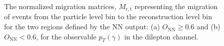 \begin{figure}[ht]
    \centering
    \quad\quad

    \caption{The normalized migration matrices, $M_{\mathrm{r,t}}$ representing the migration of events from the particle level bin to the reconstruction level bin for the two regions defined by the NN output: (a) $O_{\mathrm{NN}} \geq 0.6$ 
    and (b) $O_{\mathrm{NN}} < 0.6$, for the observable $p_T(\gamma)$ in the dilepton channel.}
    \label{fig:folding_input_migration_dilep}
\end{figure}
\FloatBarrier

